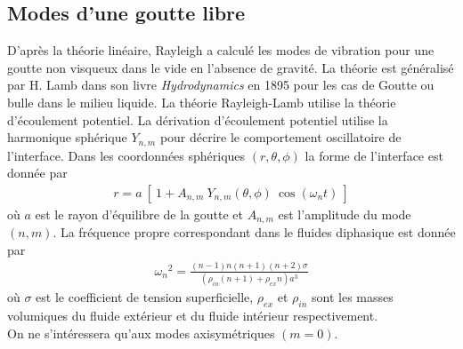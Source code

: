 \documentclass[a4paper]{report}
\begin{document}
\subsection{Modes d'une goutte libre}
D'après la théorie linéaire, Rayleigh \cite{1} a calculé les modes de vibration pour une goutte non visqueux dans le vide en l'absence de gravité. La théorie est généralisé par H. Lamb dans son livre \emph{Hydrodynamics} en 1895 \cite{2} pour les cas de Goutte ou bulle dans le milieu liquide. La théorie Rayleigh-Lamb utilise la théorie d'écoulement potentiel. La dérivation d'écoulement potentiel utilise la harmonique sphérique $Y_{n,m}$ pour décrire le comportement oscillatoire de l'interface. Dans les coordonnées sphériques $(r,\theta,\phi)$ la forme de l'interface est donnée par
\begin{eqnarray}
r = a\ [\ 1 + A_{n,m}\ Y_{n,m}(\theta,\phi)\ \cos(\omega_n t)\ ]
\end{eqnarray}
où $a$ est le rayon d'équilibre de la goutte et $A_{n,m}$ est l'amplitude du mode $(n,m)$. La fréquence propre correspondant dans le fluides diphasique est donnée par
\begin{eqnarray}
{\omega_n}^2 = \frac{ (n-1) n (n+1) (n+2) \sigma }{ ( \rho_{in} (n+1) + \rho_{ex} n ) a^3 }
\end{eqnarray}
où $\sigma$ est le coefficient de tension superficielle, $\rho_{ex}$ et $\rho_{in}$ sont les masses volumiques du fluide extérieur et du fluide intérieur respectivement.
\\[0.25cm]
On ne s'intéressera qu'aux modes axisymétriques $(m = 0)$.
\end{document}
